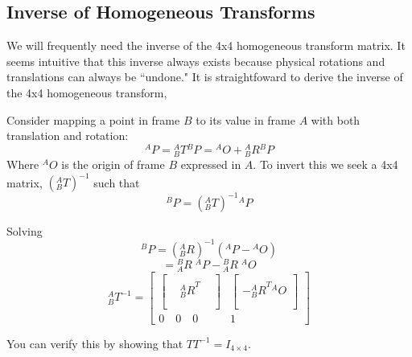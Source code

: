 \subsection{Inverse of Homogeneous Transforms}

We will frequently need the inverse of the 4x4 homogeneous transform matrix.   It seems intuitive that this inverse always exists because physical rotations and translations can always be ``undone."   It is straightfoward to derive the inverse of the 4x4 homogeneous transform,

Consider mapping a point in frame $B$ to its value in frame $A$ with both translation and rotation:
\[
^AP = {^A_BT}{^BP} = {^AO} + {^A_BR}{^BP}
\]
Where ${^AO}$ is the origin of frame $B$ expressed in $A$.
To invert this we seek a 4x4 matrix, $({^A_BT})^{-1}$ such that
\[
{^BP} = ({^A_BT})^{-1} {^AP}
\]

Solving
\[
{^BP} = ({^A_BR})^{-1}({^AP}-{^AO})
\]
\[
= {^B_AR} \; {^AP}-{^B_AR}\;{^AO}
\]
\[
{^A_B}T^{-1} =
\begin{bmatrix}
\begin{bmatrix}  &  &  \\  & {^A_BR}^T &  \\ & & \\ \end{bmatrix}      &
 \begin{bmatrix}  \\ -{^A_BR}^T {^AO} \\  \\ \end{bmatrix}            \\
 0 \quad 0 \quad 0      &   1
\end{bmatrix}
\]

You can verify this by showing that $TT^{-1} = I_{4\times4}$.


